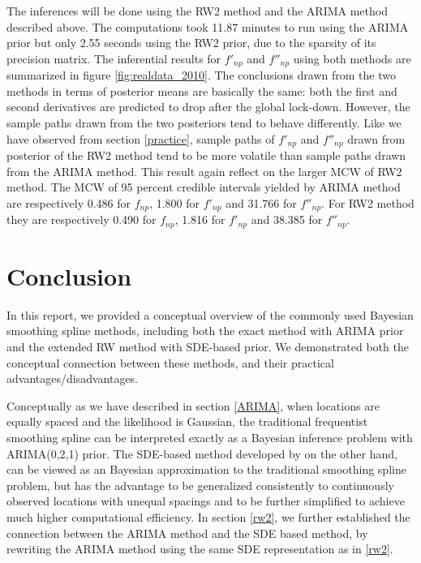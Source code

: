 \documentclass{article}
\begin{document}
The inferences will be done using the RW2 method and the ARIMA method described above. The computations took 11.87 minutes to run using the ARIMA prior but only 2.55 seconds using the RW2 prior, due to the sparsity of its precision matrix. The inferential results for $f'_{np}$ and $f''_{np}$ using both methods are summarized in figure \ref{fig:realdata_2010}. The conclusions drawn from the two methods in terms of posterior means are basically the same: both the first and second derivatives are predicted to drop after the global lock-down. However, the sample paths drawn from the two posteriors tend to behave differently. Like we have observed from section \ref{practice}, sample paths of $f'_{np}$ and $f''_{np}$ drawn from posterior of the RW2 method tend to be more volatile than sample paths drawn from the ARIMA method. This result again reflect on the larger MCW of RW2 method. The MCW of 95 percent credible intervals yielded by ARIMA method are respectively 0.486 for $f_{np}$, 1.800 for $f'_{np}$ and 31.766 for $f''_{np}$. For RW2 method they are respectively 0.490 for $f_{np}$, 1.816 for $f'_{np}$ and 38.385 for $f''_{np}$.



\section{Conclusion}\label{conclusion}

In this report, we provided a conceptual overview of the commonly used Bayesian smoothing spline methods, including both the exact method with ARIMA prior and the extended RW method with SDE-based prior. We demonstrated both the conceptual connection between these methods, and their practical advantages/disadvantages. 

Conceptually as we have described in section \ref{ARIMA}, when locations are equally spaced and the likelihood is Gaussian, the traditional frequentist smoothing spline can be interpreted exactly as a Bayesian inference problem with ARIMA(0,2,1) prior. The SDE-based method developed by \cite{rw2} on the other hand, can be viewed as an Bayesian approximation to the traditional smoothing spline problem, but has the advantage to be generalized consistently to continuously observed locations with unequal spacings and to be further simplified to achieve much higher computational efficiency. In section \ref{rw2}, we further established the connection between the ARIMA method and the SDE based method, by rewriting the ARIMA method using the same SDE representation as in \ref{rw2}.
\end{document}
